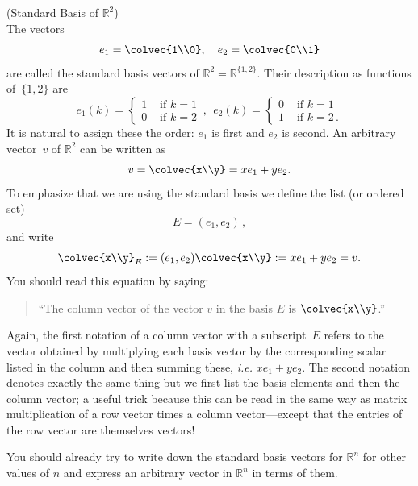 \begin{example} (Standard Basis of $\mathbb{R}^2$)\\
The vectors 
\[
e_1=\colvec{1\\0},~~~
e_2=\colvec{0\\1}
\]
are called the standard basis vectors of $\mathbb{R}^2=\mathbb{R}^{\{1,2\}}$. 
Their description as functions of~$\{1,2\}$ are 
\begin{displaymath}
   e_1 (k)= \left\{
     \begin{array}{lr}
       1 & \text{~if~} k=1\\
       0 & \text{~if~} k=2
     \end{array}
   \right. \, ,~~
   e_2 (k)= \left\{
     \begin{array}{ll}
       0 & \text{~if~} k=1\\
       1 & \text{~if~} k=2\, .
     \end{array}
   \right.
\end{displaymath} 
It is  natural to assign these  the order: $e_1$ is first and $e_2$ is second.
An arbitrary vector~$v$ of $\mathbb{R}^2$ can be written as  
\[
v=\colvec{x\\y}=x e_1+ ye_2 .
\]
To emphasize that we are using the standard basis we define the list (or ordered set) \[E=(e_1,e_2)\, ,\] and write 
\[
\colvec{x\\y}_E:=(e_1,e_2)\colvec{x\\y}:=x e_1+ ye_2=v .
\]
You should read this equation by saying:
\begin{quote}
``The column vector of the vector $v$ in the basis $E$ is $\colvec{x\\y}$.''
\end{quote}

Again, the first notation of a column vector with a subscript~$E$ refers to the vector obtained by multiplying each basis vector
by the corresponding scalar listed in the column and then  summing these, {\itshape i.e.} $xe_1+y e_2$. 
The second notation denotes exactly the same thing but we first list the basis elements and then the column vector; a useful trick
because this can be read in the same way as matrix multiplication of a row vector times a column vector---except that the entries of the row vector are themselves vectors! 
\end{example}

You should already try to write down the standard basis vectors for $\mathbb{R}^n$ for other values of $n$ and express an arbitrary vector in $\mathbb{R}^n$  in terms of them.%

